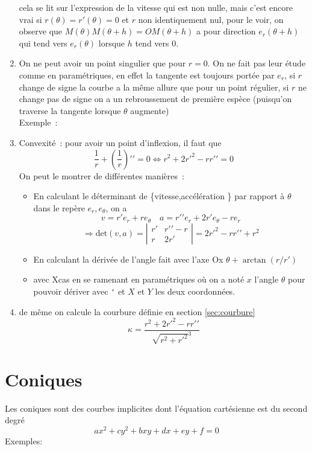 \documentclass[a4paper,11pt]{book}
\begin{document}
\begin{giacjshere}
\begin{enumerate}
{cela se lit sur l'expression de la vitesse qui est non nulle, mais
c'est encore vrai si $r(\theta)=r'(\theta)=0$ et $r$ non identiquement nul, 
pour le voir, on observe que $M(\theta)M(\theta+h)=OM(\theta+h)$ a pour
direction $e_r(\theta+h)$ qui tend vers $e_r(\theta)$ lorsque $h$ tend
vers 0.}
\item On ne peut avoir un point singulier que pour $r=0$. On ne fait
pas leur \'etude comme en param\'etriques, en effet la tangente est
toujours port\'ee par $e_r$, si $r$ change de signe la courbe
a la m\^eme allure que pour un point r\'egulier, si $r$ ne change pas
de signe on a un rebroussement de premi\`ere esp\`ece (puisqu'on
traverse la tangente lorsque $\theta$ augmente)\\
Exemple~: 
\item Convexité~:  pour avoir un point d'inflexion, il faut que 
$$\frac1r + \left(\frac1r\right)'{'}=0
\Leftrightarrow
r^2+2r'^2-rr'{'}=0
$$
On peut le montrer de diff\'erentes mani\`eres~:
\begin{itemize}
\item En calculant le d\'eterminant de \{vitesse,acc\'el\'eration \}
par rapport \`a $\theta$ dans le rep\`ere $e_r,e_\theta$, on a
$$v=r'e_r+re_\theta \quad a=r'{'}e_r+2r'e_\theta-re_r$$
$$ \Rightarrow \mbox{det}(v,a)=\left| \begin{array}{cc} r' & r'{'}-r \\
r & 2r'\end{array}\right|=2r'^2-r r'{'}+r^2$$ 
\item En calculant la d\'eriv\'ee de l'angle fait avec l'axe Ox
$\theta+\arctan(r/r')$ 
\item avec Xcas en se ramenant en param\'etriques
où on a noté $x$ l'angle $\theta$ pour pouvoir dériver avec \verb|'|
et $X$ et $Y$ les deux coordonnées.
\end{itemize}
\item de même on calcule la courbure d\'efinie en section \ref{sec:courbure}
$$ \kappa = \frac{r^2+2r'^2-rr'{'}}{\sqrt{r^2+r'^2}^3}$$
\end{enumerate}

\section{Coniques}
Les coniques sont des courbes implicites dont l'\'equation
cart\'esienne est du second degr\'e~
$$ax^2+cy^2+bxy+dx+ey+f=0$$
Exemples:\\


\end{giacjshere}
\end{document}

